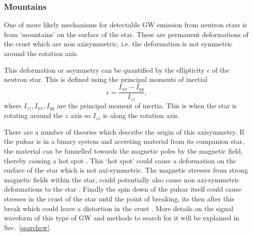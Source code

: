 \subsubsection{Mountains}

One of more likely mechanisms for detectable \gls{GW} emission from neutron stars is from `mountains' on the surface of the star.
These are permanent deformations of the crust which are non axisymmetric, i.e. the deformation is not symmetric around the rotation axis.

This deformation or asymmetry can be quantified by the ellipticity $\epsilon$ of the neutron star.
This is defined using the principal moments of inertial
\begin{equation}
\label{ellipticity}
\epsilon = \frac{I_{xx}-I_{yy}}{I_{zz}},
\end{equation}
where $I_{zz},I_{xx},I_{yy}$ are the principal moment of inertia.
This is when the star is rotating around the $z$ axis so $I_{zz}$ is along the rotation axis. 

There are a number of theories which describe the origin of this axisymmetry.
If the pulsar is in a binary system and accreting material from its companion star, the material can be funnelled towards the magnetic poles by the magnetic field, thereby causing a hot spot \citep{haskell2015DetectingGravitational}.
This `hot spot' could cause a deformation on the surface of the star which is not axi-symmetric. 
The magnetic stresses from strong magnetic fields within the star, could potentially also cause non axi-symmetric deformations to the star \citep{}.
Finally the spin down of the pulsar itself could cause stresses in the crust of the star until the point of breaking, its then after this break which could leave a distortion in the crust \citep{becker2009NeutronStars}.
More details on the signal waveform of this type of \gls{GW} and methods to search for it will be explained in Sec.~\ref{searchcw}.
 
